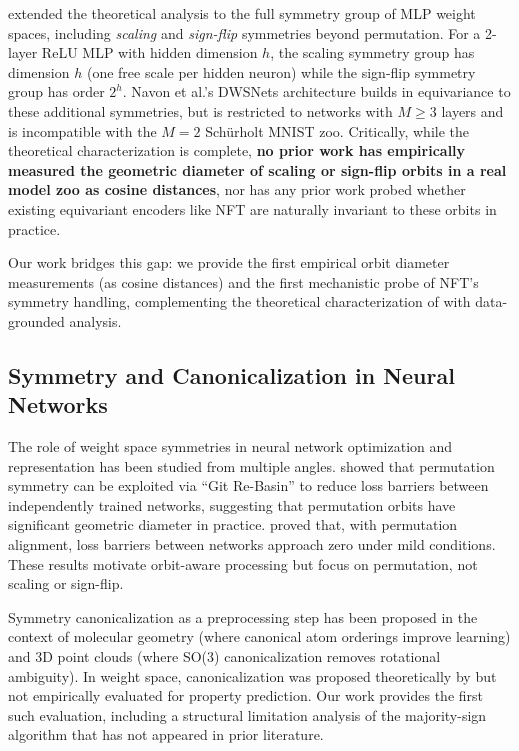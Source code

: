 \citet{Navon2023EquivariantArchitectures} extended the theoretical analysis to the full symmetry group of MLP weight spaces, including \textit{scaling} and \textit{sign-flip} symmetries beyond permutation. For a 2-layer ReLU MLP with hidden dimension $h$, the scaling symmetry group has dimension $h$ (one free scale per hidden neuron) while the sign-flip symmetry group has order $2^h$. Navon et al.'s DWSNets architecture builds in equivariance to these additional symmetries, but is restricted to networks with $M \geq 3$ layers and is incompatible with the $M=2$ Schürholt MNIST zoo. Critically, while the theoretical characterization is complete, \textbf{no prior work has empirically measured the geometric diameter of scaling or sign-flip orbits in a real model zoo as cosine distances}, nor has any prior work probed whether existing equivariant encoders like NFT are naturally invariant to these orbits in practice.

Our work bridges this gap: we provide the first empirical orbit diameter measurements (as cosine distances) and the first mechanistic probe of NFT's symmetry handling, complementing the theoretical characterization of \citet{Navon2023EquivariantArchitectures} with data-grounded analysis.

\subsection{Symmetry and Canonicalization in Neural Networks}

The role of weight space symmetries in neural network optimization and representation has been studied from multiple angles. \citet{Ainsworth2022GitReBasin} showed that permutation symmetry can be exploited via ``Git Re-Basin'' to reduce loss barriers between independently trained networks, suggesting that permutation orbits have significant geometric diameter in practice. \citet{Entezari2022PermutationSymmetry} proved that, with permutation alignment, loss barriers between networks approach zero under mild conditions. These results motivate orbit-aware processing but focus on permutation, not scaling or sign-flip.

Symmetry canonicalization as a preprocessing step has been proposed in the context of molecular geometry (where canonical atom orderings improve learning) and 3D point clouds (where SO(3) canonicalization removes rotational ambiguity). In weight space, canonicalization was proposed theoretically by \citet{Navon2023EquivariantArchitectures} but not empirically evaluated for property prediction. Our work provides the first such evaluation, including a structural limitation analysis of the majority-sign algorithm that has not appeared in prior literature.

